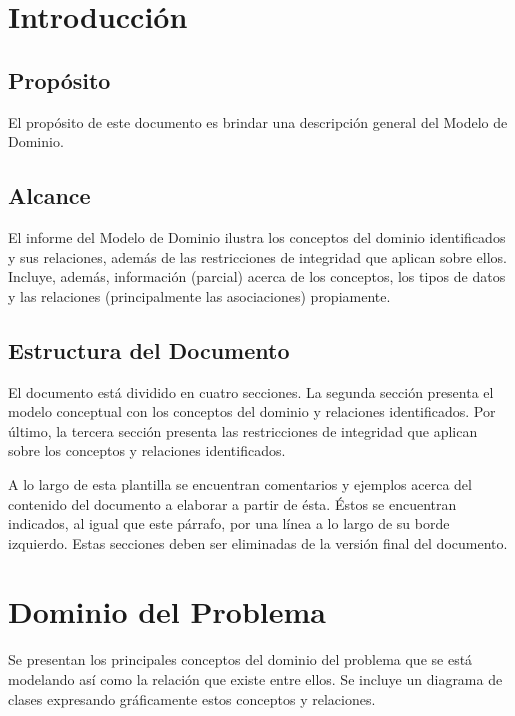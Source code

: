 \documentclass[10pt,spanish]{article}
\numberwithin{figure}{section} %
\begin{document}
\newpage
\tableofcontents

\newpage
\section{Introducción}
\subsection{Propósito}
El propósito de este documento es brindar una descripción general del Modelo de Dominio.

\subsection{Alcance}
El informe del Modelo de Dominio ilustra los conceptos del dominio identificados y sus relaciones, además de las restricciones de integridad que aplican sobre ellos. Incluye, además, información (parcial) acerca de los conceptos, los tipos de datos y las relaciones (principalmente las asociaciones) propiamente. 

\subsection{Estructura del Documento}
El documento está dividido en cuatro secciones. La segunda sección presenta el modelo conceptual con los conceptos del dominio y relaciones identificados. Por último, la tercera sección presenta las restricciones de integridad que aplican sobre los conceptos y relaciones identificados.

\begin{siderules}
A lo largo de esta plantilla se encuentran comentarios y ejemplos acerca del contenido del documento a elaborar a partir de ésta. Éstos se encuentran indicados, al igual que este párrafo, por una línea a lo largo de su borde izquierdo. Estas secciones deben ser eliminadas de la versión final del documento.
\end{siderules}

\section{Dominio del Problema}
Se presentan los principales conceptos del dominio del problema que se está modelando así como la relación que existe entre ellos. Se incluye un diagrama de clases expresando gráficamente estos conceptos y relaciones.
\end{document}
